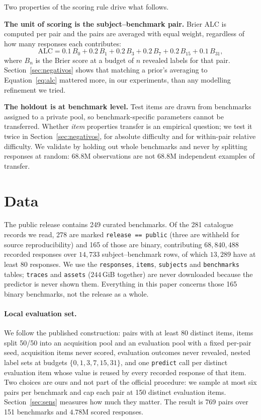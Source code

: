 \documentclass{article}
\begin{document}
Two properties of the scoring rule drive what follows.

\textbf{The unit of scoring is the subject--benchmark pair.}
Brier ALC is computed per pair and the pairs are averaged with equal weight,
regardless of how many responses each contributes:
\begin{equation}
\mathrm{ALC} = 0.1\,B_0 + 0.2\,B_1 + 0.2\,B_3 + 0.2\,B_7 + 0.2\,B_{15} + 0.1\,B_{31},
\label{eq:alc}
\end{equation}
where $B_n$ is the Brier score at a budget of $n$ revealed labels for that pair.
Section~\ref{sec:negativos} shows that matching a prior's averaging to
Equation~\eqref{eq:alc} mattered more, in our experiments, than any modelling
refinement we tried.

\textbf{The holdout is at benchmark level.} Test items are drawn from benchmarks
assigned to a private pool, so benchmark-specific parameters cannot be
transferred. Whether \emph{item} properties transfer is an empirical question;
we test it twice in Section~\ref{sec:negativos}, for absolute difficulty and for
within-pair relative difficulty. We validate by holding out whole benchmarks and
never by splitting responses at random: $68.8$M observations are not $68.8$M
independent examples of transfer.

\section{Data}

The public release contains 249 curated benchmarks. Of the 281 catalogue records
we read, 278 are marked \texttt{release == public} (three are withheld for source
reproducibility) and 165 of those are binary, contributing $68{,}840{,}488$
recorded responses over $14{,}733$ subject--benchmark rows, of which $13{,}289$
have at least 80 responses. We use the \texttt{responses}, \texttt{items},
\texttt{subjects} and \texttt{benchmarks} tables; \texttt{traces} and
\texttt{assets} ($244$\,GiB together) are never downloaded because the predictor
is never shown them. Everything in this paper concerns those 165 binary
benchmarks, not the release as a whole.

\paragraph{Local evaluation set.} We follow the published construction: pairs with
at least 80 distinct items, items split 50/50 into an acquisition pool and an
evaluation pool with a fixed per-pair seed, acquisition items never scored,
evaluation outcomes never revealed, nested label sets at budgets
$\{0,1,3,7,15,31\}$, and one \texttt{predict} call per distinct evaluation item
whose value is reused by every recorded response of that item. Two choices are
ours and not part of the official procedure: we sample at most six pairs per
benchmark and cap each pair at 150 distinct evaluation items.
Section~\ref{sec:sens} measures how much they matter. The result is 769 pairs
over 151 benchmarks and $4.78$M scored responses.
\end{document}
